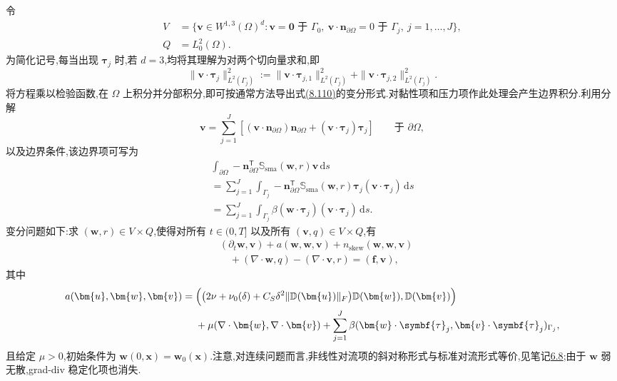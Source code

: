 \begin{note}[问题的变分形式]
\label{note:smagorinsky-generalized-variational-form}
令
\[
\begin{aligned}
 V&=\bigl\{\bm{v}\in W^{1,3}(\Omega)^d:
   \bm{v}=\bm{0}\text{ 于 }\Gamma_0,\ 
   \bm{v}\cdot\bm{n}_{\partial\Omega}=0
       \text{ 于 }\Gamma_j,\ j=1,\ldots,J\bigr\},\\
 Q&=L_0^2(\Omega).
\end{aligned}
\]
为简化记号,每当出现 $\symbf{\tau}_j$ 时,若 $d=3$,均将其理解为对两个切向量求和,即
\[
 \|\bm{v}\cdot\symbf{\tau}_j\|_{L^2(\Gamma_j)}^2
 :=\|\bm{v}\cdot\symbf{\tau}_{j,1}\|_{L^2(\Gamma_j)}^2
   +\|\bm{v}\cdot\symbf{\tau}_{j,2}\|_{L^2(\Gamma_j)}^2.
\]
将方程乘以检验函数,在 $\Omega$ 上积分并分部积分,即可按通常方法导出式\hyperref[eq:smagorinsky-generalized-strong-form]{(8.110)}的变分形式.对黏性项和压力项作此处理会产生边界积分.利用分解
\[
 \bm{v}
  =\sum_{j=1}^J\left[
      (\bm{v}\cdot\bm{n}_{\partial\Omega})\bm{n}_{\partial\Omega}
       +(\bm{v}\cdot\symbf{\tau}_j)\symbf{\tau}_j
    \right]
 \qquad\text{于 }\partial\Omega,
\]
以及边界条件,该边界项可写为
\[
 \begin{gathered}
  \int_{\partial\Omega}
    -\bm{n}_{\partial\Omega}^{\mathsf T}
       \mathbb{S}_{\mathrm{sma}}(\bm{w},r)\bm{v}\,\mathrm{d}s\\
  =\sum_{j=1}^J\int_{\Gamma_j}
      -\bm{n}_{\partial\Omega}^{\mathsf T}
       \mathbb{S}_{\mathrm{sma}}(\bm{w},r)\symbf{\tau}_j
       (\bm{v}\cdot\symbf{\tau}_j)\,\mathrm{d}s\\
  =\sum_{j=1}^J\int_{\Gamma_j}
       \beta(\bm{w}\cdot\symbf{\tau}_j)
             (\bm{v}\cdot\symbf{\tau}_j)\,\mathrm{d}s.
 \end{gathered}
\]
变分问题如下:求 $(\bm{w},r)\in V\times Q$,使得对所有 $t\in(0,T]$ 以及所有 $(\bm{v},q)\in V\times Q$,有
\begin{equation}\label{eq:smagorinsky-generalized-weak-form}
\begin{aligned}
  &(\partial_t\bm{w},\bm{v})+a(\bm{w},\bm{w},\bm{v})+n_{\mathrm{skew}}(\bm{w},\bm{w},\bm{v})\\
  &\quad+(\nabla\cdot\bm{w},q)-(\nabla\cdot\bm{v},r)=(\bm{f},\bm{v}),
\end{aligned}
\end{equation}
其中
\[
\begin{aligned}
 a(\bm{u},\bm{w},\bm{v})
  ={}&
 \Bigl(
   \bigl(2\nu+\nu_0(\delta)
       +C_S\delta^2\|\mathbb{D}(\bm{u})\|_F\bigr)
       \mathbb{D}(\bm{w}),\mathbb{D}(\bm{v})
 \Bigr)\\
 &+\mu(\nabla\cdot\bm{w},\nabla\cdot\bm{v})
   +\sum_{j=1}^J
      \beta(\bm{w}\cdot\symbf{\tau}_j,
            \bm{v}\cdot\symbf{\tau}_j)_{\Gamma_j},
\end{aligned}
\]
且给定 $\mu>0$,初始条件为 $\bm{w}(0,\bm{x})=\bm{w}_0(\bm{x})$.注意,对连续问题而言,非线性对流项的斜对称形式与标准对流形式等价,见笔记\hyperref[note:steady-ns-equivalent-variational-forms]{6.8};由于 $\bm{w}$ 弱无散,grad-div 稳定化项也消失.
\end{note}

